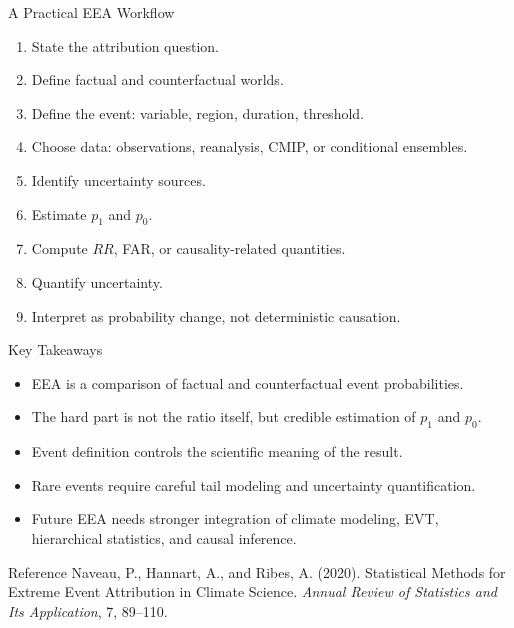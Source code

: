 \documentclass[aspectratio=169]{beamer}
\begin{document}
\begin{frame}{A Practical EEA Workflow}
  \begin{enumerate}
    \item State the attribution question.
    \item Define factual and counterfactual worlds.
    \item Define the event: variable, region, duration, threshold.
    \item Choose data: observations, reanalysis, CMIP, or conditional ensembles.
    \item Identify uncertainty sources.
    \item Estimate $p_1$ and $p_0$.
    \item Compute $RR$, FAR, or causality-related quantities.
    \item Quantify uncertainty.
    \item Interpret as probability change, not deterministic causation.
  \end{enumerate}
\end{frame}

\begin{frame}{Key Takeaways}
  \begin{itemize}
    \item EEA is a comparison of factual and counterfactual event probabilities.
    \item The hard part is not the ratio itself, but credible estimation of $p_1$ and $p_0$.
    \item Event definition controls the scientific meaning of the result.
    \item Rare events require careful tail modeling and uncertainty quantification.
    \item Future EEA needs stronger integration of climate modeling, EVT, hierarchical statistics, and causal inference.
  \end{itemize}
\end{frame}


\begin{frame}{Reference}
  \small
  Naveau, P., Hannart, A., and Ribes, A. (2020). Statistical Methods for Extreme Event Attribution in Climate Science. \emph{Annual Review of Statistics and Its Application}, 7, 89--110.
\end{frame}
\end{document}

